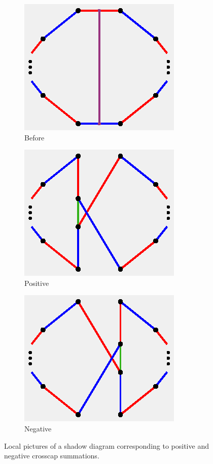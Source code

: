 \documentclass[11pt, oneside]{amsart}
\theoremstyle{theorem}
\theoremstyle{definition}
\theoremstyle{theorem}
\begin{document}
\begin{figure}[h!]
\begin{subfigure}{.33\textwidth}
  \centering
  \includegraphics[width=.75\linewidth]{perturb1.eps}
  \caption{Before}
  \label{cc1}
\end{subfigure}%
\begin{subfigure}{.33\textwidth}
  \centering
  \includegraphics[width=.75\linewidth]{cperturb1.eps}
  \caption{Positive}
  \label{cc2}
\end{subfigure}
\begin{subfigure}{.33\textwidth}
  \centering
  \includegraphics[width=.75\linewidth]{cperturb2.eps}
  \caption{Negative}
  \label{cc3}
\end{subfigure}
\caption{Local pictures of a shadow diagram corresponding to positive and negative crosscap summations.}
\label{ccap}
\end{figure}
\end{document}
